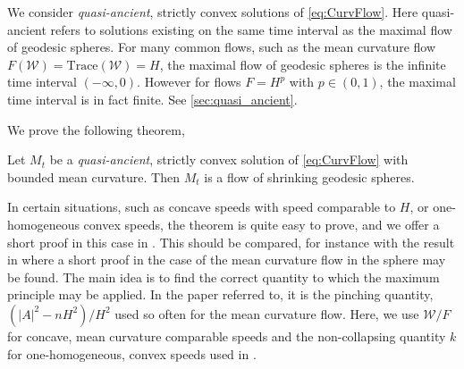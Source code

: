 \documentclass{amsart}
\begin{document}
We consider \emph{quasi-ancient}, strictly convex solutions of \eqref{eq:CurvFlow}. Here quasi-ancient refers to solutions existing on the same time interval as the maximal flow of geodesic spheres. For many common flows, such as the mean curvature flow \(F(\mathcal{W}) = \text{Trace}(\mathcal{W}) = H\), the maximal flow of geodesic spheres is the infinite time interval \((-\infty, 0)\). However for flows \(F = H^p\) with \(p \in (0,1)\), the maximal time interval is in fact finite. See \cref{sec:quasi_ancient}.

We prove the following theorem,
\begin{thm}
Let \(M_t\) be a \emph{quasi-ancient}, strictly convex solution of \eqref{eq:CurvFlow} with bounded mean curvature. Then \(M_t\) is a flow of shrinking geodesic spheres.
\end{thm}

In certain situations, such as concave speeds with speed comparable to \(H\), or one-homogeneous convex speeds, the theorem is quite easy to prove, and we offer a short proof in this case in . This should be compared, for instance with the result in \cite[Theorem]{HuiskenSinestrari:05/2014} where a short proof in the case of the mean curvature flow in the sphere may be found. The main idea is to find the correct quantity to which the maximum principle may be applied. In the paper referred to, it is the pinching quantity, \((|A|^2 - n H^2)/H^2\) used so often for the mean curvature flow. Here, we use \(\mathcal{W}/F\) for concave, mean curvature comparable speeds and the non-collapsing quantity \(k\) for one-homogeneous, convex speeds used in \cite{andrews2015Non-collapsing}.
\end{document}
